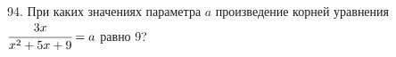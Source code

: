 94. При каких значениях параметра $a$ произведение корней уравнения $\cfrac{3x}{x^2+5x+9}=a$ равно 9?
\newpage
